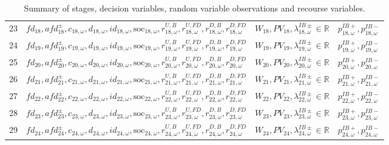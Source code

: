\documentclass{article}
\newcommand{\R}{\mathbb{R}}
\newcommand{\soc}{\text{soc}}
\begin{document}
\begin{table}
\begin{tabular}{c c c c}
	23 & $fd_{18}, afd^{\pm}_{18}, c_{18, \omega}, d_{18, \omega}, id_{18, \omega}, \soc_{18, \omega}, r^{U, B}_{18, \omega}, r^{U, FD}_{18, \omega}, r^{D, B}_{18, \omega}, r^{D, FD}_{18, \omega}$ & $W_{18}, PV_{18}, \lambda^{IB\pm}_{18, \omega} \in \R$ &  $p^{IB+}_{18, \omega}, p^{IB-}_{18, \omega}$ \\
	24 & $fd_{19}, afd^{\pm}_{19}, c_{19, \omega}, d_{19, \omega}, id_{19, \omega}, \soc_{19, \omega}, r^{U, B}_{19, \omega}, r^{U, FD}_{19, \omega}, r^{D, B}_{19, \omega}, r^{D, FD}_{19, \omega}$ & $W_{19}, PV_{19}, \lambda^{IB\pm}_{19, \omega} \in \R$ & $p^{IB+}_{19, \omega}, p^{IB-}_{19, \omega}$ \\
	25 & $fd_{20}, afd^{\pm}_{20}, c_{20, \omega}, d_{20, \omega}, id_{20, \omega}, \soc_{20, \omega}, r^{U, B}_{20, \omega}, r^{U, FD}_{20, \omega}, r^{D, B}_{20, \omega}, r^{D, FD}_{20, \omega}$  & $W_{20}, PV_{20}, \lambda^{IB\pm}_{20, \omega} \in \R$ & $p^{IB+}_{20, \omega}, p^{IB-}_{20, \omega}$ \\
	26 & $fd_{21}, afd^{\pm}_{21}, c_{21, \omega}, d_{21, \omega}, id_{21, \omega}, \soc_{21, \omega}, r^{U, B}_{21, \omega}, r^{U, FD}_{21, \omega}, r^{D, B}_{21, \omega}, r^{D, FD}_{21, \omega}$ & $W_{21}, PV_{21}, \lambda^{IB\pm}_{21, \omega} \in \R$ & $p^{IB+}_{21, \omega}, p^{IB-}_{21, \omega}$ \\
	27 & $fd_{22}, afd^{\pm}_{22}, c_{22, \omega}, d_{22, \omega}, id_{22, \omega}, \soc_{22, \omega}, r^{U, B}_{22, \omega}, r^{U, FD}_{22, \omega}, r^{D, B}_{22, \omega}, r^{D, FD}_{22, \omega}$ & $W_{22}, PV_{22}, \lambda^{IB\pm}_{22, \omega} \in \R$ & $p^{IB+}_{22, \omega}, p^{IB-}_{22, \omega}$ \\
	28 & $fd_{23}, afd^{\pm}_{23}, c_{23, \omega}, d_{23, \omega}, id_{23, \omega}, \soc_{23, \omega}, r^{U, B}_{23, \omega}, r^{U, FD}_{23, \omega}, r^{D, B}_{23, \omega}, r^{D, FD}_{23, \omega}$ & $W_{23}, PV_{23}, \lambda^{IB\pm}_{23, \omega} \in \R$ & $p^{IB+}_{23, \omega}, p^{IB-}_{23, \omega}$ \\
	29 & $fd_{24}, afd^{\pm}_{24}, c_{24, \omega}, d_{24, \omega}, id_{24, \omega}, \soc_{24, \omega}, r^{U, B}_{24, \omega}, r^{U, FD}_{24, \omega}, r^{D, B}_{24, \omega}, r^{D, FD}_{24, \omega}$ & $W_{24}, PV_{24}, \lambda^{IB\pm}_{24, \omega} \in \R$ & $p^{IB+}_{24, \omega}, p^{IB-}_{24, \omega}$ \\

\end{tabular}

\caption{Summary of stages, decision variables, random variable observations and recourse variables.}
\label{TABLE:stages-rv-dv}
\end{table}



\printbibliography
\end{document}
